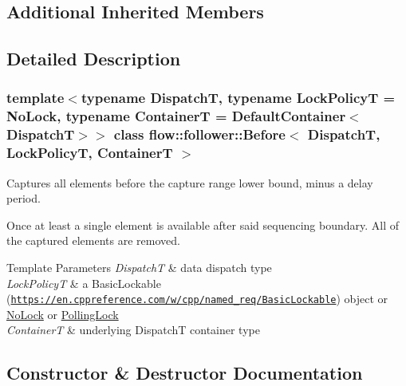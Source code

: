 \subsection*{Additional Inherited Members}


\subsection{Detailed Description}
\subsubsection*{template$<$typename DispatchT, typename Lock\+PolicyT = No\+Lock, typename ContainerT = Default\+Container$<$\+Dispatch\+T$>$$>$\newline
class flow\+::follower\+::\+Before$<$ Dispatch\+T, Lock\+Policy\+T, Container\+T $>$}

Captures all elements before the capture range lower bound, minus a delay period. 

Once at least a single element is available after said sequencing boundary. All of the captured elements are removed.


\begin{DoxyTemplParams}{Template Parameters}
{\em DispatchT} & data dispatch type \\
\hline
{\em Lock\+PolicyT} & a Basic\+Lockable (\href{https://en.cppreference.com/w/cpp/named_req/BasicLockable}{\tt https\+://en.\+cppreference.\+com/w/cpp/named\+\_\+req/\+Basic\+Lockable}) object or \hyperlink{structflow_1_1_no_lock}{No\+Lock} or \hyperlink{structflow_1_1_polling_lock}{Polling\+Lock} \\
\hline
{\em ContainerT} & underlying {\ttfamily DispatchT} container type \\
\hline
\end{DoxyTemplParams}


\subsection{Constructor \& Destructor Documentation}
\mbox{\label{classflow_1_1follower_1_1_before_a9c0ed69cd555e62c90f7bf70aedf0859}} 
